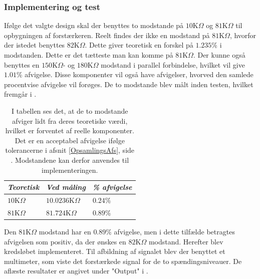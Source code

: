\subsubsection{Implementering og test}
Ifølge det valgte design skal der benyttes to modstande på $10$K$\Omega$ og $81$K$\Omega$ til opbygningen af forstærkeren. Reelt findes der ikke en modstand på $81$K$\Omega$, hvorfor der istedet benyttes $82$K$\Omega$. Dette giver teoretisk en forskel på $1.235$\% i modstanden. Dette er det tætteste man kan komme på $81$K$\Omega$. Der kunne også benyttes en $150$K$\Omega$- og $180$K$\Omega$ modstand i parallel forbindelse, hvilket vil give $1.01$\% afvigelse. Disse komponenter vil også have afvigelser, hvorved den samlede procentvise afvigelse vil forøges. De to modstande blev målt inden testen, hvilket fremgår i .
\begin{table}[H]
	\centering
	\begin{tabular}{|l|l|l|}
		\hline
		\textit{Teoretisk} & \textit{Ved måling} & \textit{\% afvigelse} \\ \hline
		$10$K$\Omega$      & $10.0236$K$\Omega$    & $0.24$\%           \\ \hline
		$81$K$\Omega$      & $81.724$K$\Omega$     & $0.89$\%           \\ \hline
	\end{tabular}
	\caption{I tabellen ses det, at de to modstande afviger lidt fra deres teoretiske værdi, hvilket er forventet af reelle komponenter. Det er en acceptabel afvigelse ifølge tolerancerne i afsnit \ref{OpsamlingsAfs}, side \pageref{OpsamlingsAfs}. Modstandene kan derfor anvendes til implementeringen.}
	\label{Tab:modstand_faktor18}
\end{table}
\noindent Den $81$K$\Omega$ modstand har en $0.89\%$ afvigelse, men i dette tilfælde betragtes afvigelsen som positiv, da der ønskes en $82$K$\Omega$ modstand. Herefter blev kredsløbet implementeret. Til afbildning af signalet blev der benyttet et multimeter, som viste det forstærkede signal for de to spændingsniveauer. De aflæste resultater er angivet under "Output" i .\
